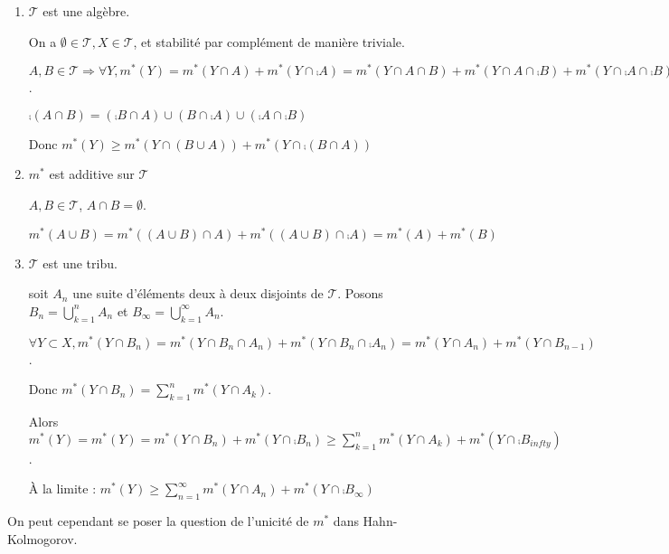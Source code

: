 \documentclass[10pt,a4paper,notitlepage ]{report}
\begin{document}
\begin{demo}[Carathéodory]
	
	\begin{enumerate}
		\item $\mathcal T$ est une algèbre. 
		\begin{demo} On a $\emptyset \in \mathcal T, X \in \mathcal T$, et stabilité par complément de manière triviale.
		
		$A,B \in \mathcal T \Rightarrow \forall Y, m^*(Y) = m^*(Y\cap A) + m^*(Y \cap \comp A) = m^*(Y \cap A \cap B) + m^*(Y \cap A \cap \comp B) + m^*(Y \cap \comp A \cap \comp B) + m^*(Y \cap \comp A \cap B)$.
		
		\begin{rem}
			$\comp{(A \cap B)} = (\comp B \cap A) \cup (B \cap \comp A) \cup (\comp A \cap \comp B)$
		\end{rem}
		Donc $m^*(Y) \ge m^*(Y \cap (B \cup A)) + m^*(Y \cap \comp{(B \cap A)})$
		\end{demo}
		\item $m^*$ est additive sur $\mathcal T$
		\begin{demo}
			$A,B \in \mathcal T$, $A\cap B = \emptyset$.
			
			$m^*(A\cup B) = m^*((A\cup B)\cap A) + m^*((A \cup B) \cap \comp A) = m^*(A) + m^*(B)$
		\end{demo}
		\item $\mathcal T$ est une tribu.
		\begin{demo}
			soit $A_n$ une suite d'éléments deux à deux disjoints de $\mathcal T$. Posons $B_n =\bigcup_{k=1}^n A_n$ et $B_\infty = \bigcup_{k=1}^\infty A_n$.
			
			$\forall Y \subset X, m^*(Y \cap B_n) = m^*(Y \cap B_n \cap A_n) + m^*(Y \cap B_n \cap \comp{A_n}) = m^*(Y \cap A_n) + m^*(Y \cap B_{n-1})$.
			
			Donc $m^*(Y\cap B_n) = \sum_{k=1}^n m^*(Y \cap A_k)$.
			
			Alors $m^*(Y) = m^*(Y) = m^*(Y \cap B_n) + m^*(Y \cap \comp{B_n}) \ge \sum_{k=1}^n m^*(Y \cap A_k) + m^*(Y \cap \comp{B_{infty}})$.
			
			À la limite : $m^*(Y) \ge \sum_{n=1}^\infty m^*(Y \cap A_n) + m^*(Y \cap \comp{B_{\infty}})$
		\end{demo}
	\end{enumerate}
\end{demo}

On peut cependant se poser la question de l'unicité de $m^*$ dans Hahn-Kolmogorov.
\end{document}
